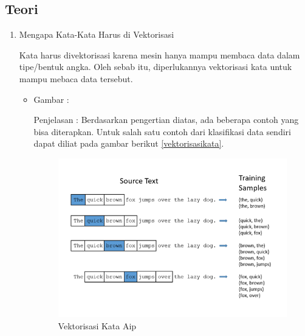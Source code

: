 \subsection{Teori}
\begin{enumerate}

\item Mengapa Kata-Kata Harus di Vektorisasi
\par Kata harus divektorisasi karena mesin hanya mampu membaca data dalam tipe/bentuk angka. Oleh sebab itu, diperlukannya vektorisasi kata untuk mampu mebaca data tersebut. 
\par
\begin{itemize}
\item Gambar :
\par Penjelasan : Berdasarkan pengertian diatas, ada beberapa contoh yang bisa diterapkan. Untuk salah satu contoh dari klasifikasi data sendiri dapat diliat pada gambar berikut \ref{vektorisasikata}.
\begin{figure}
\centering
\includegraphics[scale=0.6]{figures/AIP/d1.PNG}
\caption{Vektorisasi Kata Aip}
\label{text-Aip}
\end{figure}
\end{itemize}


\end{enumerate}
